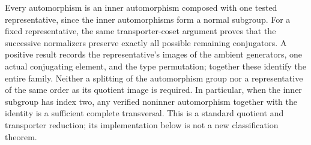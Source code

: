 Every automorphism is an inner automorphism composed with one tested
representative, since the inner automorphisms form a normal subgroup.
For a fixed representative, the same transporter-coset argument proves
that the successive normalizers preserve exactly all possible remaining
conjugators. A positive result records the representative's images of
the ambient generators, one actual conjugating element, and the type
permutation; together these identify the entire family. Neither a
splitting of the automorphism group nor a representative of the same
order as its quotient image is required. In particular, when the inner
subgroup has index two, any verified noninner automorphism together
with the identity is a sufficient complete transversal. This is a
standard quotient and transporter reduction; its implementation below
is not a new classification theorem.

